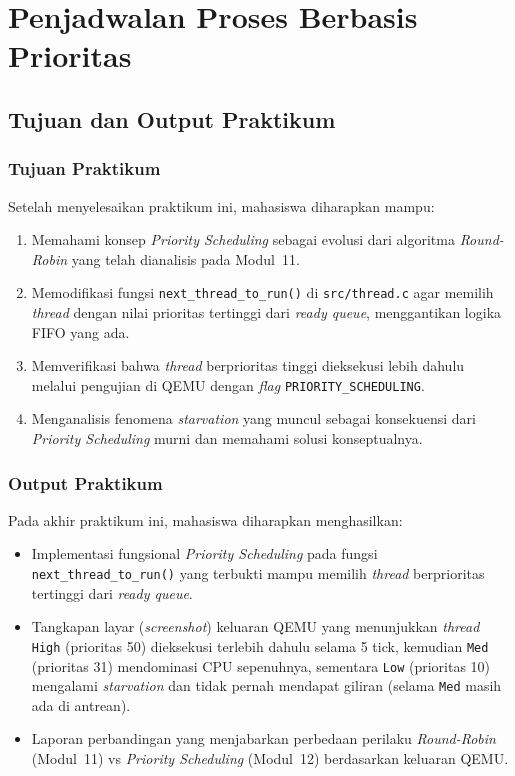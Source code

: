 
\chapter{Penjadwalan Proses Berbasis Prioritas}
\label{chap:modul-12}

\section{Tujuan dan Output Praktikum}

\subsection{Tujuan Praktikum}
Setelah menyelesaikan praktikum ini, mahasiswa diharapkan mampu:
\begin{enumerate}
	\item Memahami konsep \textit{Priority Scheduling} sebagai evolusi dari algoritma \textit{Round-Robin} yang telah dianalisis pada Modul~11.
	\item Memodifikasi fungsi \texttt{next\_thread\_to\_run()} di \texttt{src/thread.c} agar memilih \textit{thread} dengan nilai prioritas tertinggi dari \textit{ready queue}, menggantikan logika FIFO yang ada.
	\item Memverifikasi bahwa \textit{thread} berprioritas tinggi dieksekusi lebih dahulu melalui pengujian di QEMU dengan \textit{flag} \texttt{PRIORITY\_SCHEDULING}.
	\item Menganalisis fenomena \textit{starvation} yang muncul sebagai konsekuensi dari \textit{Priority Scheduling} murni dan memahami solusi konseptualnya.
\end{enumerate}

\subsection{Output Praktikum}
Pada akhir praktikum ini, mahasiswa diharapkan menghasilkan:
\begin{itemize}
	\item Implementasi fungsional \textit{Priority Scheduling} pada fungsi \texttt{next\_thread\_to\_run()} yang terbukti mampu memilih \textit{thread} berprioritas tertinggi dari \textit{ready queue}.
	\item Tangkapan layar (\textit{screenshot}) keluaran QEMU yang menunjukkan \textit{thread} \texttt{High} (prioritas 50) dieksekusi terlebih dahulu selama 5 tick, kemudian \texttt{Med} (prioritas 31) mendominasi CPU sepenuhnya, sementara \texttt{Low} (prioritas 10) mengalami \textit{starvation} dan tidak pernah mendapat giliran (selama \texttt{Med} masih ada di antrean).
	\item Laporan perbandingan yang menjabarkan perbedaan perilaku \textit{Round-Robin} (Modul~11) vs \textit{Priority Scheduling} (Modul~12) berdasarkan keluaran QEMU.
\end{itemize}

